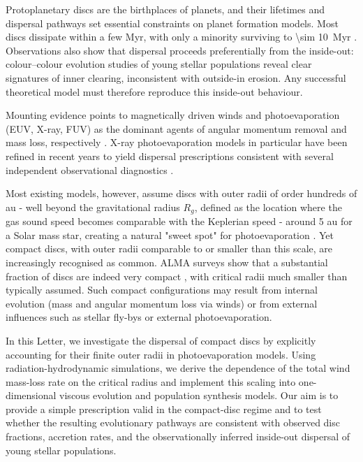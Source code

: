 \documentclass[letters,fleqn,usenatbib]{mnras}
\begin{document}
 Protoplanetary discs are the birthplaces of planets, and their lifetimes and dispersal pathways set essential constraints on planet formation models. Most discs dissipate within a few Myr, with only a minority surviving to \SI{\sim 10}{Myr} \citep{2001ApJ...553L.153H, 2010A&A...510A..72F}. Observations also show that dispersal proceeds preferentially from the inside-out: colour–colour evolution studies of young stellar populations \citep{2011MNRAS.410..671E, 2013MNRAS.428.3327K, 2015MNRAS.452.3689E} reveal clear signatures of inner clearing, inconsistent with outside-in erosion. Any successful theoretical model must therefore reproduce this inside-out behaviour.

 Mounting evidence points to magnetically driven winds and photoevaporation (EUV, X-ray, FUV) as the dominant agents of angular momentum removal and mass loss, respectively \citep{2017RSOS....470114E, 2023ASPC..534..465L, 2023ASPC..534..567P}. X-ray photoevaporation models in particular have been refined in recent years to yield dispersal prescriptions consistent with several independent observational diagnostics \citep{2016MNRAS.460.3472E, 2020MNRAS.496..223W, 2021A&A...648A.121F, 2023ApJ...955L..11R, 2023MNRAS.526L.105E}.

 Most existing models, however, assume discs with outer radii of order hundreds of au - well beyond the gravitational radius $R_g$, defined as the location where the gas sound speed becomes comparable with the Keplerian speed - around 5 au for a Solar mass star, creating a natural "sweet spot" for photoevaporation \citep{1994ApJ...428..654H, 2003PASA...20..337L}. Yet compact discs, with outer radii comparable to or smaller than this scale, are increasingly recognised as common. ALMA surveys show that a substantial fraction of discs are indeed very compact \citep[e.g.][]{Trapman_2025}, with critical radii much smaller than typically assumed. Such compact configurations may result from internal evolution (mass and angular momentum loss via winds) or from external influences such as stellar fly-bys or external photoevaporation.

 In this Letter, we investigate the dispersal of compact discs by explicitly accounting for their finite outer radii in photoevaporation models. Using radiation-hydrodynamic simulations, we derive the dependence of the total wind mass-loss rate on the critical radius and implement this scaling into one-dimensional viscous evolution and population synthesis models. Our aim is to provide a simple prescription valid in the compact-disc regime and to test whether the resulting evolutionary pathways are consistent with observed disc fractions, accretion rates, and the observationally inferred inside-out dispersal of young stellar populations.
\end{document}
